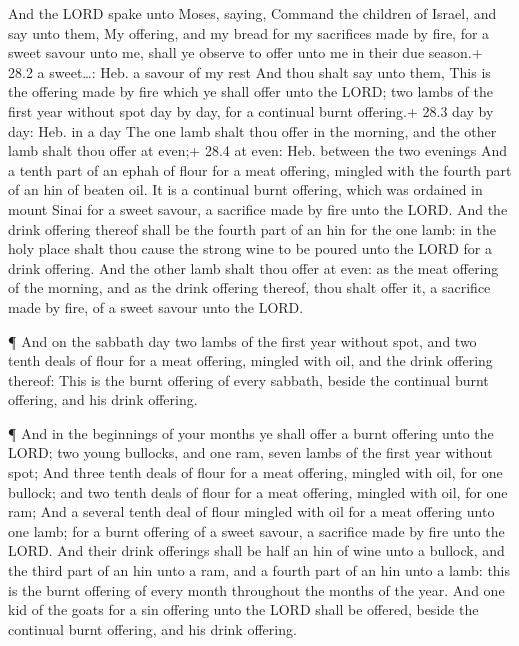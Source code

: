  And the LORD spake unto Moses, saying,  Command
the children of Israel, and say unto them, My offering, and my bread for
my sacrifices made by fire, for a sweet savour unto me, shall ye observe
to offer unto me in their due season.+ 28.2 a sweet\ldots: Heb. a savour
of my rest  And thou shalt say unto them, This is the
offering made by fire which ye shall offer unto the LORD; two lambs of
the first year without spot day by day, for a continual burnt offering.+
28.3 day by day: Heb. in a day  The one lamb shalt thou
offer in the morning, and the other lamb shalt thou offer at even;+ 28.4
at even: Heb. between the two evenings  And a tenth part of
an ephah of flour for a meat offering, mingled with the fourth part of
an hin of beaten oil.  It is a continual burnt offering,
which was ordained in mount Sinai for a sweet savour, a sacrifice made
by fire unto the LORD.  And the drink offering thereof shall
be the fourth part of an hin for the one lamb: in the holy place shalt
thou cause the strong wine to be poured unto the LORD for a drink
offering.  And the other lamb shalt thou offer at even: as
the meat offering of the morning, and as the drink offering thereof,
thou shalt offer it, a sacrifice made by fire, of a sweet savour unto
the LORD.

 ¶ And on the sabbath day two lambs of the first year
without spot, and two tenth deals of flour for a meat offering, mingled
with oil, and the drink offering thereof:  This is the
burnt offering of every sabbath, beside the continual burnt offering,
and his drink offering.

 ¶ And in the beginnings of your months ye shall offer a
burnt offering unto the LORD; two young bullocks, and one ram, seven
lambs of the first year without spot;  And three tenth
deals of flour for a meat offering, mingled with oil, for one bullock;
and two tenth deals of flour for a meat offering, mingled with oil, for
one ram;  And a several tenth deal of flour mingled with
oil for a meat offering unto one lamb; for a burnt offering of a sweet
savour, a sacrifice made by fire unto the LORD.  And their
drink offerings shall be half an hin of wine unto a bullock, and the
third part of an hin unto a ram, and a fourth part of an hin unto a
lamb: this is the burnt offering of every month throughout the months of
the year.  And one kid of the goats for a sin offering unto
the LORD shall be offered, beside the continual burnt offering, and his
drink offering.

